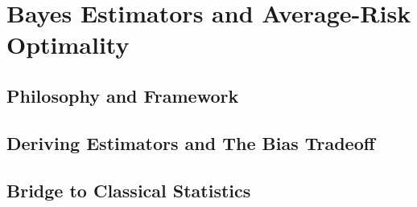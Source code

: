 \chapter{Bayes Estimators and Average-Risk Optimality}

\section{Philosophy and Framework}
\section{Deriving Estimators and The Bias Tradeoff}
\section{Bridge to Classical Statistics}